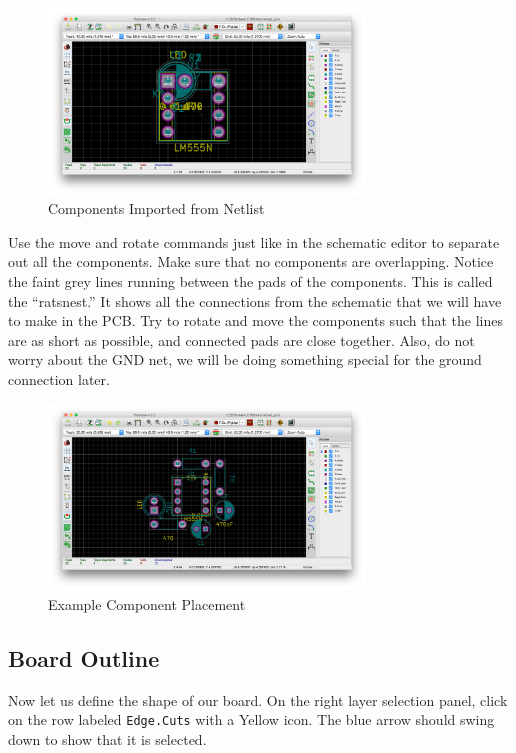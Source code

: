 \documentclass[12pt, oneside]{article}
\begin{document}
\begin{figure}[H]
\includegraphics[width=0.75\textwidth]{ImportedNetlist}
\centering
\caption{Components Imported from Netlist}
\end{figure}

Use the move and rotate commands just like in the schematic editor to separate out all the components. Make sure that no components are overlapping. Notice the faint grey lines running between the pads of the components. This is called the ``ratsnest.'' It shows all the connections from the schematic that we will have to make in the PCB. Try to rotate and move the components such that the lines are as short as possible, and connected pads are close together. Also, do not worry about the GND net, we will be doing something special for the ground connection later. 

\begin{figure}[H]
\includegraphics[width=0.75\textwidth]{ComponentPlacement}
\centering
\caption{Example Component Placement}
\end{figure}

\subsection{Board Outline}
Now let us define the shape of our board. On the right layer selection panel, click on the row labeled \texttt{Edge.Cuts} with a Yellow icon. The blue arrow should swing down to show that it is selected. 
\end{document}
